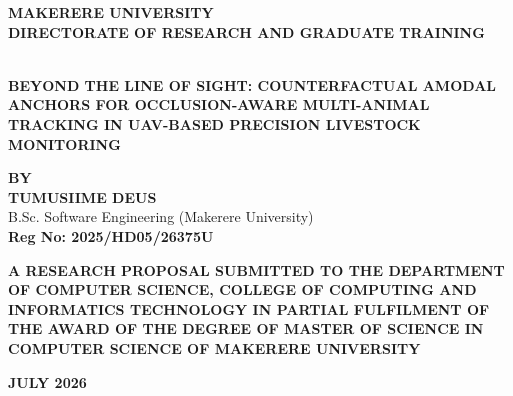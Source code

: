 \documentclass[12pt]{article}
\begin{document}
\thispagestyle{empty}
\begin{center}
    {\large \textbf{MAKERERE \hfill UNIVERSITY}} \\
    \vspace{0.2in}
    {\small \textbf{DIRECTORATE OF RESEARCH AND GRADUATE TRAINING}} \\
    \vspace{0.4in}
    
     \\
    
    \vspace{0.5in}
    {\large \textbf{BEYOND THE LINE OF SIGHT: COUNTERFACTUAL AMODAL ANCHORS FOR OCCLUSION-AWARE MULTI-ANIMAL TRACKING IN UAV-BASED PRECISION LIVESTOCK MONITORING}} \\
    \vspace{0.5in}
    
    \textbf{BY} \\
    \vspace{0.2in}
    \textbf{TUMUSIIME DEUS} \\
    {\small B.Sc. Software Engineering (Makerere University)} \\
    \textbf{Reg No: 2025/HD05/26375U} \\
    \vspace{0.5in}
    
    \textbf{A RESEARCH PROPOSAL SUBMITTED TO THE DEPARTMENT OF COMPUTER SCIENCE, COLLEGE OF COMPUTING AND INFORMATICS TECHNOLOGY IN PARTIAL FULFILMENT OF THE AWARD OF THE DEGREE OF MASTER OF SCIENCE IN COMPUTER SCIENCE OF MAKERERE UNIVERSITY} \\
    \vspace{0.5in}
    
    \textbf{JULY 2026}
\end{center}
\clearpage
\end{document}
